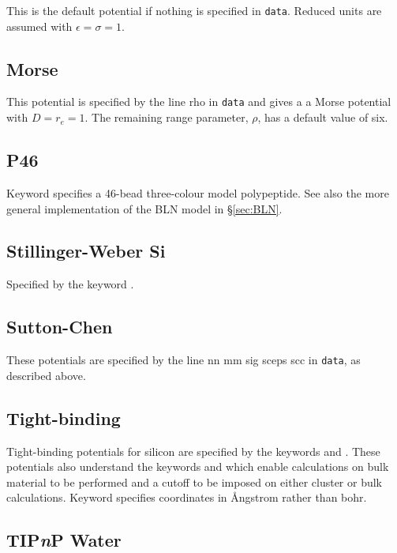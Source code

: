 This is the default potential if nothing is specified in {\tt data}. Reduced units are
assumed with $\epsilon=\sigma=1$.

\subsection{Morse}

This potential is specified by the line { rho\/} in {\tt data} and gives a
a Morse potential with $D=r_e=1$. 
The remaining range parameter,\cite{braierbw90,doyewb95,doyew96a} $\rho$, has a default 
value of six.

\subsection{P46}

Keyword {\/} specifies a 46-bead three-colour model polypeptide. 
See also the more general implementation of the BLN model in \S \ref{sec:BLN}.

\subsection{Stillinger-Weber Si}

Specified by the keyword {\/}.

\subsection{Sutton-Chen}

These potentials\cite{suttonc90} are specified by the line { nn mm sig sceps scc\/} in {\tt data},
as described above. 

\subsection{Tight-binding}

Tight-binding potentials for silicon are specified by the keywords {\/} 
and {\/}.
These potentials also understand the 
keywords {\/} and {\/} which enable calculations on bulk material
to be performed and a cutoff to be imposed on either cluster or bulk calculations.
Keyword {\/} specifies coordinates in \AA ngstrom rather than bohr.

\subsection{TIP{\it n\/}P Water}

